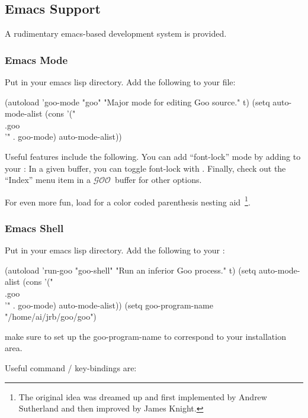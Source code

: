 \documentclass[twoside,twocolumn,9pt]{extarticle}
\newcommand{\goo}{$\mathcal{GOO}$}
\begin{document}
\subsection{Emacs Support}

A rudimentary emacs-based development system is provided.

\subsubsection{Emacs Mode}

Put  in your emacs lisp directory.  Add the following to
your  file:

\begin{exv}
(autoload 'goo-mode "goo" "Major mode for editing Goo source." t)
(setq auto-mode-alist
      (cons '("\\.goo\\'" . goo-mode) auto-mode-alist))
\end{exv}

Useful features include the following.
You can add ``font-lock'' mode by adding 
 to your :
In a given buffer, you can toggle font-lock with .
Finally, check out the ``Index'' menu item in a \goo\ buffer for other
options.

For even more fun, load  for a color
coded parenthesis nesting aid~\footnote{The original idea was dreamed
up and first implemented by Andrew Sutherland and then improved by
James Knight.}.

\subsubsection{Emacs Shell}

Put  in your emacs lisp directory.  Add the
following to your :

\begin{exv}
(autoload 'run-goo  "goo-shell" "Run an inferior Goo process." t)
(setq auto-mode-alist
      (cons '("\\.goo\\'" . goo-mode) auto-mode-alist))
(setq goo-program-name "/home/ai/jrb/goo/goo") 
\end{exv}

make sure to set up the goo-program-name to correspond to your
installation area.

Useful command / key-bindings are:
\end{document}
